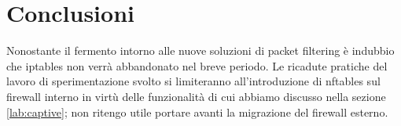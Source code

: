 \section{Conclusioni}

Nonostante il fermento intorno alle nuove soluzioni di packet filtering \`e
indubbio che iptables non verr\`a abbandonato nel breve periodo.  Le ricadute pratiche
del lavoro di sperimentazione svolto si limiteranno all'introduzione di
nftables sul firewall interno in virt\`u delle funzionalit\`a di
cui abbiamo discusso nella sezione \ref{lab:captive}; non ritengo utile
portare avanti la migrazione del firewall esterno.
